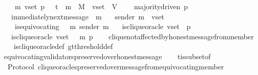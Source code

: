 \begin{isabellebody}
\ \ {\isachardoublequoteopen}{\isasymforall}\ {\isasymsigma}\ m\ v{\isacharunderscore}set\ p{\isachardot}\ {\isasymsigma}\ {\isasymin}\ {\isasymSigma}t\ {\isasymand}\ m\ {\isasymin}\ M\ {\isasymand}\ v{\isacharunderscore}set\ {\isasymsubseteq}\ V\ \isanewline
\ \ {\isasymlongrightarrow}\ majority{\isacharunderscore}driven\ p\isanewline
\ \ {\isasymlongrightarrow}\ immediately{\isacharunderscore}next{\isacharunderscore}message\ {\isacharparenleft}{\isasymsigma}{\isacharcomma}\ m{\isacharparenright}\isanewline
\ \ {\isasymlongrightarrow}\ sender\ m\ {\isasymin}\ v{\isacharunderscore}set\isanewline
\ \ {\isasymlongrightarrow}\ {\isasymnot}\ is{\isacharunderscore}equivocating\ {\isacharparenleft}{\isasymsigma}\ {\isasymunion}\ {\isacharbraceleft}m{\isacharbraceright}{\isacharparenright}\ {\isacharparenleft}sender\ m{\isacharparenright}\isanewline
\ \ {\isasymlongrightarrow}\ is{\isacharunderscore}clique{\isacharunderscore}oracle\ {\isacharparenleft}v{\isacharunderscore}set{\isacharcomma}\ {\isasymsigma}{\isacharcomma}\ p{\isacharparenright}\ \isanewline
\ \ {\isasymlongrightarrow}\ is{\isacharunderscore}clique{\isacharunderscore}oracle\ {\isacharparenleft}v{\isacharunderscore}set{\isacharcomma}\ {\isasymsigma}\ {\isasymunion}\ {\isacharbraceleft}m{\isacharbraceright}{\isacharcomma}\ p{\isacharparenright}{\isachardoublequoteclose}\isanewline
%
\isadelimproof
\ \ %
\endisadelimproof
%
\isatagproof
{}\isamarkupfalse%
\ clique{\isacharunderscore}not{\isacharunderscore}affected{\isacharunderscore}by{\isacharunderscore}honest{\isacharunderscore}message{\isacharunderscore}from{\isacharunderscore}member\isanewline
\ \ \isamarkupfalse%
\ is{\isacharunderscore}clique{\isacharunderscore}oracle{\isacharunderscore}def\ gt{\isacharunderscore}threshold{\isacharunderscore}def\isanewline
\ \ \isamarkupfalse%
\ equivocating{\isacharunderscore}validators{\isacharunderscore}preserved{\isacharunderscore}over{\isacharunderscore}honest{\isacharunderscore}message\isanewline
\ \ \isamarkupfalse%
\ {\isasymSigma}t{\isacharunderscore}is{\isacharunderscore}subset{\isacharunderscore}of{\isacharunderscore}{\isasymSigma}\isanewline
\ \ \isamarkupfalse%
%
\endisatagproof
{\isafoldproof}%
%
\isadelimproof
\ \ \isanewline
%
\endisadelimproof
\isanewline
\isanewline
{}\isamarkupfalse%
\ {\isacharparenleft}\ Protocol{\isacharparenright}\ clique{\isacharunderscore}oracles{\isacharunderscore}preserved{\isacharunderscore}over{\isacharunderscore}message{\isacharunderscore}from{\isacharunderscore}equivocating{\isacharunderscore}member\ {\isacharcolon}\isanewline

\end{isabellebody}
